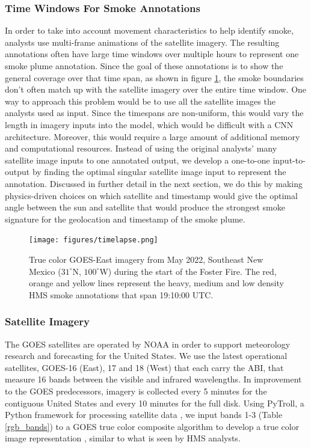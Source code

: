 \documentclass{article}
\begin{document}
\subsubsection*{Time Windows For Smoke Annotations}

In order to take into account movement characteristics to help identify smoke, analysts use multi-frame animations of the satellite imagery. The resulting annotations often have large time windows over multiple hours to represent one smoke plume annotation. Since the goal of these annotations is to show the general coverage over that time span, as shown in figure \ref{timelapse}, the smoke boundaries don't often match up with the satellite imagery over the entire time window. One way to approach this problem would be to use all the satellite images the analysts used as input. Since the timespans are non-uniform, this would vary the length in imagery inputs into the model, which would be difficult with a CNN architecture. Moreover, this would require a large amount of additional memory and computational resources. Instead of using the original analysts' many satellite image inputs to one annotated output, we develop a one-to-one input-to-output by finding the optimal singular satellite image input to represent the annotation. Discussed in further detail in the next section, we do this by making physics-driven choices on which satellite and timestamp would give the optimal angle between the sun and satellite that would produce the strongest smoke signature for the geolocation and timestamp of the smoke plume.


\begin{figure} \label{timelapse}
    \centering
    \texttt{[image: figures/timelapse.png]}
    \caption{True color GOES-East imagery from May 2022, Southeast New Mexico (\(31^{\circ}\)N, \(100^{\circ}\)W) during the start of the Foster Fire. The red, orange and yellow lines represent the heavy, medium and low density HMS smoke annotations that span 19:10:00 UTC.}
\end{figure}


\subsubsection*{Satellite Imagery} 

The GOES satellites are operated by NOAA in order to support meteorology research and forecasting for the United States. We use the latest operational satellites, GOES-16 (East), 17 and 18 (West) that each carry the ABI, that measure 16 bands between the visible and infrared wavelengths. In improvement to the GOES predecessors, imagery is collected every 5 minutes for the contiguous United States and every 10 minutes for the full disk. Using PyTroll, a Python framework for processing satellite data \cite{satpy}, we input bands 1-3 (Table \ref{rgb_bands}) to a GOES true color composite algorithm to develop a true color image representation \cite{true_color}, similar to what is seen by HMS analysts.
\end{document}
